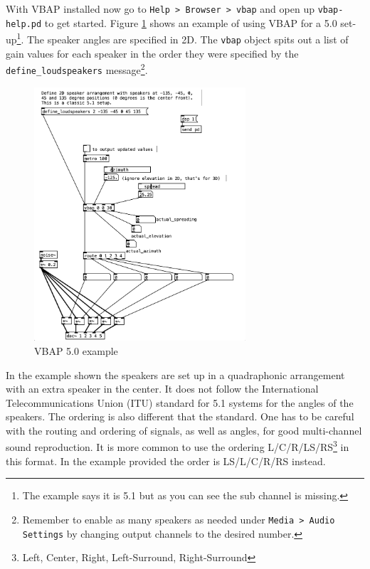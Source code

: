 With VBAP installed now go to \texttt{Help > Browser > vbap} and open up \texttt{vbap-help.pd} to get started. Figure \ref{fig:vbap-5.0} shows an example of using VBAP for a 5.0 set-up\footnote{The example says it is 5.1 but as you can see the sub channel is missing.}. The speaker angles are specified in 2D. The \texttt{vbap} object spits out a list of gain values for each speaker in the order they were specified by the \texttt{define\_loudspeakers} message\footnote{Remember to enable as many speakers as needed under \texttt{Media > Audio Settings} by changing output channels to the desired number.}.

\begin{figure}[ht!]%
\centering
\includegraphics[width=0.7\textwidth]{img/vbap-5.1.png} 
\caption{VBAP 5.0 example}
\label{fig:vbap-5.0}
\end{figure}

In the example shown the speakers are set up in a quadraphonic arrangement with an extra speaker in the center. It does not follow the International Telecommunications Union (ITU) standard for 5.1 systems \cite{series2010multichannel} for the angles of the speakers. The ordering is also different that the standard. One has to be careful with the routing and ordering of signals, as well as angles, for good multi-channel sound reproduction. It is more common to use the ordering L/C/R/LS/RS\footnote{Left, Center, Right, Left-Surround, Right-Surround} in this format. In the example provided the order is LS/L/C/R/RS instead. 

